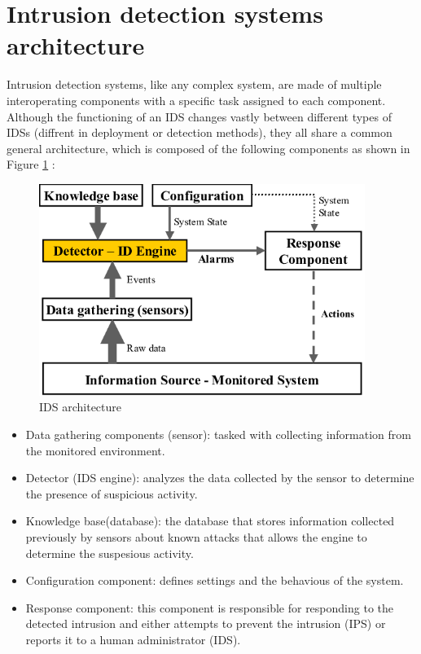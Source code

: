\section{Intrusion detection systems architecture}
Intrusion detection systems, like any complex system, are made of multiple interoperating components with a specific task assigned to each component. Although the functioning of an IDS changes vastly between different types of IDSs (diffrent in deployment or detection methods), they all share a common general architecture, which is composed of the following components as shown in Figure \ref{fig:arch_IDS} \cite{arch-IDS}:

\begin{figure}[h]
	\centering
	\includegraphics[width=400px]{figures/arch_IDS.png}
	\caption{IDS architecture \cite{arch-IDS}}
	\label{fig:arch_IDS}
\end{figure}

\firmlist
\begin{itemize}
	\item Data gathering components (sensor): tasked with collecting information from the monitored environment.
	\item Detector (IDS engine): analyzes the data collected by the sensor to determine the presence of suspicious activity.
	\item Knowledge base(database): the database that stores information collected previously by sensors about known attacks that allows the engine to determine the suspesious activity.
	\item Configuration component: defines settings and the behavious of the system.
	\item Response component: this component is responsible for responding to the detected intrusion and either attempts to prevent the intrusion (IPS) or reports it to a human administrator (IDS).
\end{itemize}




